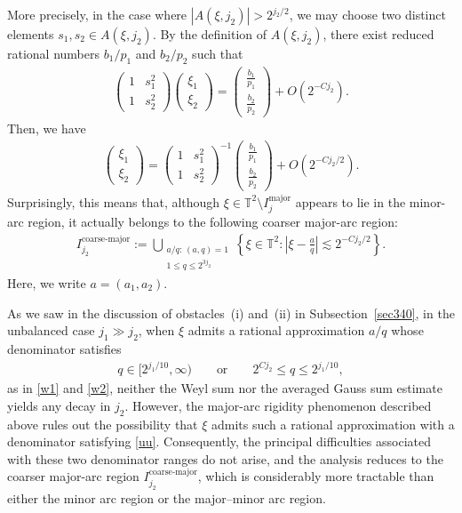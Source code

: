 \documentclass[11 pt,letterpaper]{amsart}
\theoremstyle{plain}
\theoremstyle{definition}
\theoremstyle{remark} \theoremstyle{exam} \theoremstyle{ob}
\numberwithin{equation}{section}
\begin{document}
 More precisely, in the case where $|A(\xi,j_2)|>2^{j_2/2}$, we may choose two distinct elements  $s_1,s_2\in A(\xi,j_2)$. By the definition of $A(\xi,j_2)$, there exist reduced rational numbers $b_1/p_1$ and $b_2/p_2$ such that
\begin{align*}
	\left(\begin{matrix}1&s_1^{2}\\
		1&s_2^{2}
	\end{matrix}\right) \left(\begin{matrix}\xi_{1}\\
		\xi_{2}
	\end{matrix}\right)=\left(\begin{matrix}\frac{b_1}{p_1}\\
		\frac{b_2}{p_2}
	\end{matrix}\right)+O(2^{-Cj_2}).
\end{align*}
Then, we have \begin{align*}
	 \left(\begin{matrix}\xi_{1}\\
		\xi_{2}
	\end{matrix}\right)=\left(\begin{matrix}1&s_1^{2}\\
	1&s_2^{2}
	\end{matrix}\right)^{-1}\left(\begin{matrix}\frac{b_1}{p_1}\\
		\frac{b_2}{p_2}
	\end{matrix}\right)+O(2^{-Cj_2/2}).
\end{align*}
Surprisingly, this means that, although
$\xi \in \mathbb{T}^2 \setminus I_j^{\mathrm{major}}$
appears to lie in the  minor-arc region, it actually belongs to the following coarser major-arc region:
\begin{align*}
	I_{j_2}^{\mathrm{coarse\text{-}major}}
	:=
	\bigcup_{\substack{a/q:\,(a,q)=1\\1\leq q\leq 2^{3j_2}}}
	\left\{
	\xi\in\mathbb{T}^2:
	\left|\xi-\frac{a}{q}\right|
	\lesssim 2^{-Cj_2/2}
	\right\}.
\end{align*}Here, we write $a=(a_1,a_2)$.




As we saw in the discussion of obstacles~(i) and~(ii) in Subsection~\ref{sec340}, in the unbalanced case $j_1\gg j_2$, when $\xi$ admits a rational approximation $a/q$ whose denominator satisfies \begin{align}\label{uu}
	 q\in[2^{j_1/10},\infty) \qquad\text{or}\qquad 2^{Cj_2}\leq q\leq 2^{j_1/10}, 
\end{align} as in \eqref{w1} and \eqref{w2}, neither the Weyl sum  nor the averaged Gauss sum estimate yields any decay in $j_2$. However, the major-arc rigidity phenomenon described above rules out the possibility that $\xi$ admits such a rational approximation with a denominator satisfying \eqref{uu}.  Consequently, the principal difficulties associated with these two denominator ranges do not arise, and the analysis reduces to the coarser major-arc region $I_{j_2}^{\mathrm{coarse\text{-}major}}$, which is considerably more tractable than either the minor arc region or the major--minor arc region.
\end{document}
